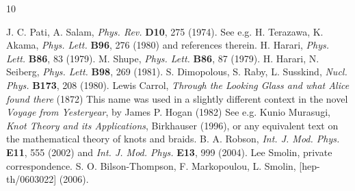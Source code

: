 \documentclass[twocolumn,showpacs,preprintnumbers,amsmath,amssymb]{revtex4}
\begin{document}
\begin{thebibliography}{10}

 J. C. Pati, A. Salam, {\em Phys. Rev.} {\bf D10}, 275 (1974).
 See e.g. H. Terazawa, K. Akama, {\em Phys. Lett.} {\bf B96}, 276 (1980) and references therein.
 H. Harari, {\em Phys. Lett.} {\bf B86}, 83 (1979).
 M. Shupe, {\em Phys. Lett.} {\bf B86}, 87 (1979).
  H. Harari, N. Seiberg, {\em Phys. Lett.} {\bf B98}, 269 (1981).
 S. Dimopolous, S. Raby, L. Susskind, {\em Nucl. Phys.} {\bf B173}, 208 (1980).  
 Lewis Carrol, {\em Through the Looking Glass and what Alice found there} (1872)
 This name was used in a slightly different context in the novel {\em Voyage from Yesteryear}, by James P. Hogan (1982)
 See e.g. Kunio Murasugi, {\em Knot Theory and its Applications}, Birkhauser (1996), or any equivalent text on the mathematical theory of knots and braids.
 B. A. Robson, {\em Int. J. Mod. Phys.} {\bf E11}, 555 (2002) and 
{\em Int. J. Mod. Phys.} {\bf E13}, 999 (2004).
 Lee Smolin, private correspondence.
 S. O. Bilson-Thompson, F. Markopoulou, L. Smolin, [hep-th/0603022] (2006).

\end{thebibliography}
\end{document}
